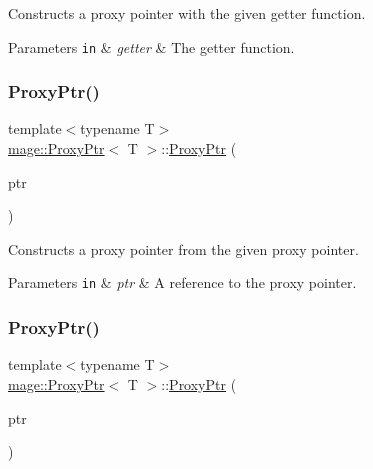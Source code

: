 Constructs a proxy pointer with the given getter function.


\begin{DoxyParams}[1]{Parameters}
\mbox{\tt in}  & {\em getter} & The getter function. \\
\hline
\end{DoxyParams}
\hypertarget{classmage_1_1_proxy_ptr_aa31b385e10ba8ab7ce91791078e9ed6d}{}\label{classmage_1_1_proxy_ptr_aa31b385e10ba8ab7ce91791078e9ed6d} 
\subsubsection{\texorpdfstring{Proxy\+Ptr()}{ProxyPtr()}\hspace{0.1cm}{\footnotesize\ttfamily [5/8]}}
{\footnotesize\ttfamily template$<$typename T$>$ \\
\hyperlink{classmage_1_1_proxy_ptr}{mage\+::\+Proxy\+Ptr}$<$ T $>$\+::\hyperlink{classmage_1_1_proxy_ptr}{Proxy\+Ptr} (\begin{DoxyParamCaption}\item[{const \hyperlink{classmage_1_1_proxy_ptr}{Proxy\+Ptr}$<$ T $>$ \&}]{ptr }\end{DoxyParamCaption})\hspace{0.3cm}{\ttfamily [noexcept]}}

Constructs a proxy pointer from the given proxy pointer.


\begin{DoxyParams}[1]{Parameters}
\mbox{\tt in}  & {\em ptr} & A reference to the proxy pointer. \\
\hline
\end{DoxyParams}
\hypertarget{classmage_1_1_proxy_ptr_a51e4a025cd9ca419a2c4b687b4c430bb}{}\label{classmage_1_1_proxy_ptr_a51e4a025cd9ca419a2c4b687b4c430bb} 
\subsubsection{\texorpdfstring{Proxy\+Ptr()}{ProxyPtr()}\hspace{0.1cm}{\footnotesize\ttfamily [6/8]}}
{\footnotesize\ttfamily template$<$typename T$>$ \\
\hyperlink{classmage_1_1_proxy_ptr}{mage\+::\+Proxy\+Ptr}$<$ T $>$\+::\hyperlink{classmage_1_1_proxy_ptr}{Proxy\+Ptr} (\begin{DoxyParamCaption}\item[{\hyperlink{classmage_1_1_proxy_ptr}{Proxy\+Ptr}$<$ T $>$ \&\&}]{ptr }\end{DoxyParamCaption})\hspace{0.3cm}{\ttfamily [noexcept]}}

